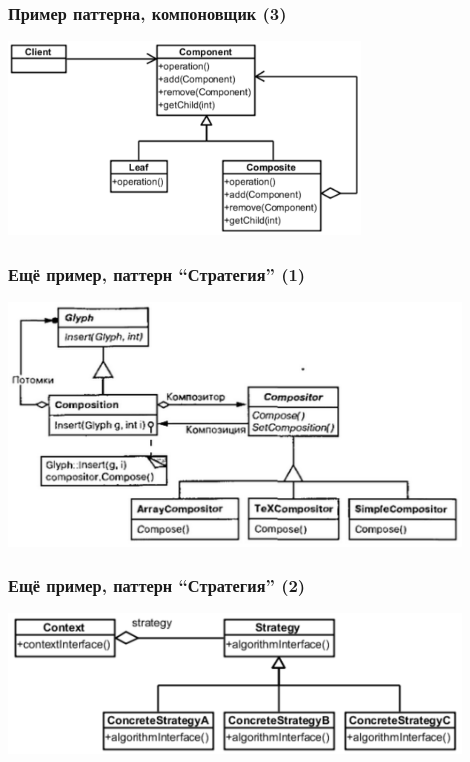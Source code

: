 \documentclass[xetex,mathserif,serif]{beamer}
\begin{document}
	\begin{frame}
		\frametitle{Пример паттерна, компоновщик (3)}
		\begin{center}
			\includegraphics[width=0.7\textwidth]{composite.png}
		\end{center}
	\end{frame}

	\begin{frame}
		\frametitle{Ещё пример, паттерн ``Стратегия'' (1)}
		\begin{center}
			\includegraphics[width=0.9\textwidth]{glyphCompositor.png}
		\end{center}
	\end{frame}

	\begin{frame}
		\frametitle{Ещё пример, паттерн ``Стратегия'' (2)}
		\begin{center}
			\includegraphics[width=0.9\textwidth]{strategy.png}
		\end{center}
	\end{frame}
\end{document}
